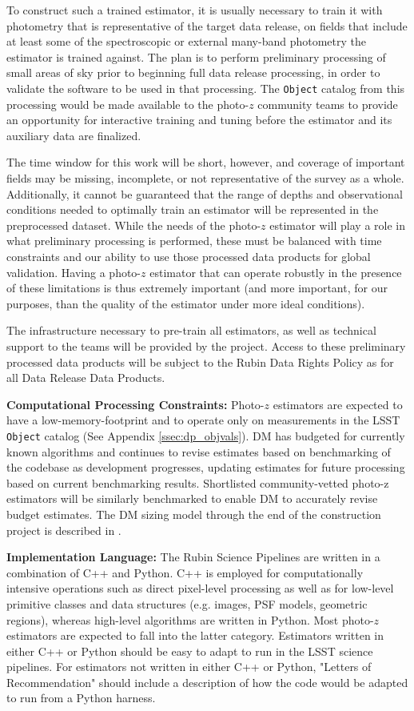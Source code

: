 \documentclass[DM,lsstdraft,toc]{lsstdoc}
\begin{document}
To construct such a trained estimator, it is usually necessary to train it with photometry that is representative of the target data release, on fields that include at least some of the spectroscopic or external many-band photometry the estimator is trained against.
The plan is to perform preliminary processing of small areas of sky prior to beginning full data release processing, in order to validate the software to be used in that processing.
The {\tt Object} catalog from this processing would be made available to the photo-$z$ community teams to provide an opportunity for interactive training and tuning before the estimator and its auxiliary data are finalized.

The time window for this work will be short, however, and coverage of important fields may be missing, incomplete, or not representative of the survey as a whole.
Additionally, it cannot be guaranteed that the range of depths and observational conditions needed to optimally train an estimator will be represented in the preprocessed dataset. 
While the needs of the photo-$z$ estimator will play a role in what preliminary processing is performed, these must be balanced with time constraints and our ability to use those processed data products for global validation.
Having a photo-$z$ estimator that can operate robustly in the presence of these limitations is thus extremely important (and more important, for our purposes, than the quality of the estimator under more ideal conditions).

The infrastructure necessary to pre-train all estimators, as well as technical support to the teams will be provided by the project. 
Access to these preliminary processed data products will be subject to the Rubin Data Rights Policy as for all Data Release Data Products. 
 
\textbf{Computational Processing Constraints:}
Photo-$z$ estimators are expected to have a low-memory-footprint and to operate only on measurements in the LSST {\tt Object} catalog (See Appendix \ref{ssec:dp_objvals}). 
DM has budgeted for currently known algorithms and continues to revise estimates based on benchmarking of the codebase as development progresses, updating estimates for future processing based on current benchmarking results.  
Shortlisted community-vetted photo-z estimators will be similarly benchmarked to enable DM to accurately revise budget estimates. 
The DM sizing model through the end of the construction project is described in \cite{dmtn-135}.

\textbf{Implementation Language:}
The Rubin Science Pipelines are written in a combination of C++ and Python. 
C++ is employed for computationally intensive operations such as direct pixel-level processing as well as for low-level primitive classes and data structures (e.g. images, PSF models, geometric regions), whereas high-level algorithms are written in Python. 
Most photo-$z$ estimators are expected to fall into the latter category.
Estimators written in either C++ or Python should be easy to adapt to run in the LSST science pipelines. 
For estimators not written in either C++ or Python, "Letters of Recommendation" should include a description of how the code would be adapted to run from a Python harness.
\end{document}
